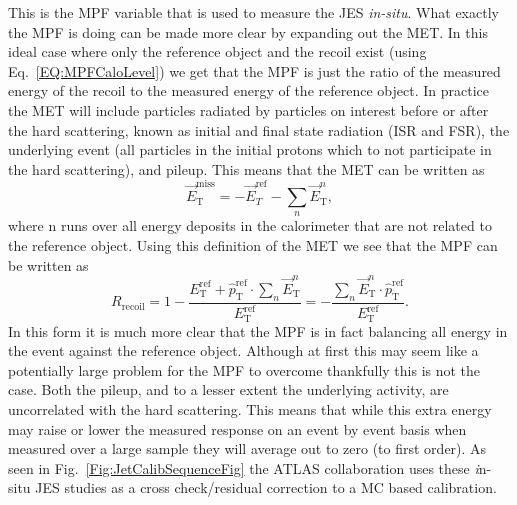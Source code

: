 This is the MPF variable that is used to measure the JES \textit{in-situ}.  
What exactly the MPF is doing can be made more clear by expanding out the MET.  
In this ideal case where only the reference object and the recoil exist (using Eq.~\ref{EQ:MPFCaloLevel}) we get that the MPF is just the ratio of the measured energy of the recoil to the measured energy of the reference object.  
In practice the MET will include particles radiated by particles on interest before or after the hard scattering, known as initial and final state radiation (ISR and FSR), the underlying event (all particles in the initial protons which to not participate in the hard scattering), and pileup.  
This means that the MET can be written as 
\begin{equation}
  \vec{E}_{\mathrm T}^{\mathrm{miss}} = -\vec{E}_{T}^{\mathrm{ref}}-\sum_{n}\vec{E}_{\mathrm T}^{n},
\end{equation}
where n runs over all energy deposits in the calorimeter that are not related to the reference object.  
Using this definition of the MET we see that the MPF can be written as 
\begin{equation}
  R_{\mathrm{recoil}}=1-\frac{E_{\mathrm T}^{\mathrm{ref}}+\hat{p}_{\mathrm T}^{\mathrm{ref}}\cdot\sum_{n}\vec{E}_{\mathrm T}^{n}}{E_{\mathrm T}^{\mathrm{ref}}}=-\frac{\sum_{n}\vec{E}_{\mathrm T}^{n}\cdot\hat{p}_{\mathrm T}^{\mathrm{ref}}}{E_{\mathrm T}^{\mathrm{ref}}}.
\end{equation}
In this form it is much more clear that the MPF is in fact balancing all energy in the event against the reference object.  
Although at first this may seem like a potentially large problem for the MPF to overcome thankfully this is not the case.  
Both the pileup, and to a lesser extent the underlying activity, are uncorrelated with the hard scattering.  
This means that while this extra energy may raise or lower the measured response on an event by event basis when measured over a large sample they will average out to zero (to first order).  
As seen in Fig.~\ref{Fig:JetCalibSequenceFig} the ATLAS collaboration uses these {\textit in-situ} JES studies as a cross check/residual correction to a MC based calibration.  

